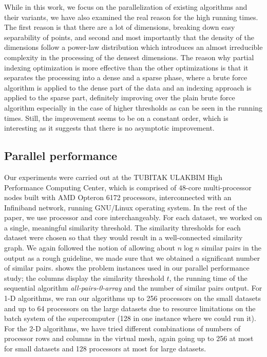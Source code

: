 \documentclass{comjnl}
\newcommand{\var}[1]{\mbox{\textsl{#1}}} %
\begin{document}
While in this work, we focus on the parallelization of existing
algorithms and their variants, we have also examined the real reason
for the high running times. The first reason is that there are a lot
of dimensions, breaking down easy separability of points, and second
and most importantly that the density of the dimensions follow a
power-law distribution which introduces an almost irreducible
complexity in the processing of the densest dimensions. The reason why
partial indexing optimization is more effective than the other
optimizations is that it separates the processing into a dense and a
sparse phase, where a brute force algorithm is applied to the dense
part of the data and an indexing approach is applied to the sparse
part, definitely improving over the plain brute force algorithm
especially in the case of higher thresholds as can be seen in the
running times. Still, the improvement seems to be on a constant order,
which is interesting as it suggests that there is no asymptotic
improvement.

\subsection{Parallel performance}
\label{sec:speedup}

Our experiments were carried out at the TUBITAK ULAKBIM High
Performance Computing Center, which is comprised of $48$-core
multi-processor nodes built with AMD Opteron 6172 processors,
interconnected with an Infiniband network, running GNU/Linux operating
system. In the rest of the paper, we use processor and core
interchangeably.  For each dataset, we worked on a single, meaningful
similarity threshold.  The similarity thresholds for each dataset were
chosen so that they would result in a well-connected similarity
graph. We again followed the notion of allowing about $n \log n$
similar pairs in the output as a rough guideline, we made sure that we
obtained a significant number of similar
pairs.  shows the problem instances used in
our parallel performance study; the columns display the similarity
threshold $t$, the running time of the sequential algorithm
\var{all-pairs-0-array} and the number of similar pairs output.  For 1-D
algorithms, we ran our algorithms up to 256 processors on the small
datasets and up to 64 processors on the large datasets due to resource
limitations on the batch system of the supercomputer (128 in one
instance where we could run it). For the 2-D algorithms, we have tried
different combinations of numbers of processor rows and columns in the
virtual mesh, again going up to 256 at most for small datasets and 128
processors at most for large datasets.
\end{document}
